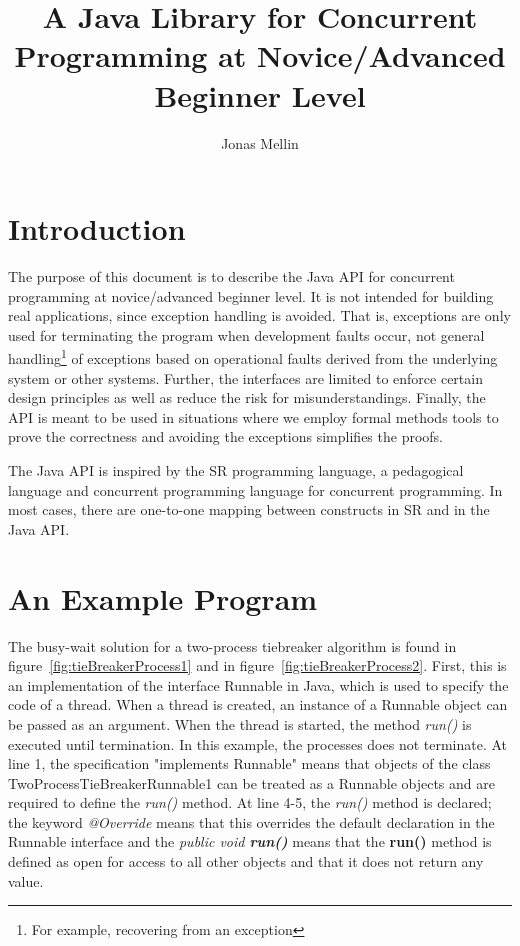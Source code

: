 \documentclass[11pt]{article} %
\title{A Java Library for Concurrent Programming at Novice/Advanced Beginner Level}
\author{Jonas Mellin}
\begin{document}
\maketitle

\section{Introduction}

The purpose of this document is to describe the Java API for concurrent programming at novice/advanced beginner level. It is not intended for building real applications, since exception handling is avoided. That is, exceptions are only used for terminating the program when development faults occur, not general handling\footnote{For example, recovering from an exception} of exceptions based on operational faults derived from the underlying system or other systems. Further, the interfaces are limited to enforce certain design principles as well as reduce the risk for misunderstandings. Finally, the API is meant to be used in situations where we employ formal methods tools to prove the correctness and avoiding the exceptions simplifies the proofs.

The Java API is inspired by the SR programming language, a pedagogical language and concurrent programming language for concurrent programming. In most cases, there are one-to-one mapping between constructs in SR and in the Java API. 



\section{An Example Program}

The busy-wait solution for a two-process tiebreaker algorithm is found in figure~\ref{fig:tieBreakerProcess1} and in figure~\ref{fig:tieBreakerProcess2}. First, this is an implementation of the interface Runnable in Java, which is used to specify the code of a thread. When a thread is created, an instance of a Runnable object can be passed as an argument. When the thread is started, the method \emph{ run()} is executed until termination. In this example, the processes does not terminate. At line 1, the specification "implements Runnable" means that objects of the class TwoProcessTieBreakerRunnable1 can be treated as a Runnable objects and are required to define the \emph{ run()} method. At line 4-5, the \emph{ run()} method is declared; the keyword \emph{@Override} means that this overrides the default declaration in the Runnable interface and the \emph{public  void {\bfseries run()}} means that the {\bfseries run()} method is defined as open for access to all other objects and that it does not return any value. 
\end{document}
